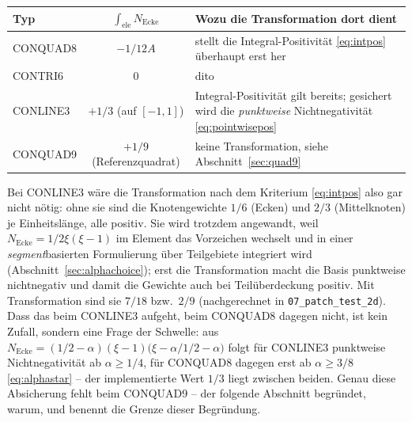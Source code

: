 \documentclass[a4paper,11pt]{article}
\def\tfrac#1#2{#1/#2}%
\def\tilde#1{#1}%
\newcommand{\file}[1]{\texttt{\small #1}}
\begin{document}
\begin{center}
\small
\begin{tabularx}{\linewidth}{lcX}
\toprule
Typ & $\int_{\text{ele}} N_{\text{Ecke}}$ & Wozu die Transformation dort dient \\
\midrule
CONQUAD8 & $-\tfrac{1}{12}A$ & stellt die Integral-Positivität \eqref{eq:intpos} überhaupt erst her \\
CONTRI6  & $0$               & dito \\
CONLINE3 & $+\tfrac13$ (auf $[-1,1]$) & Integral-Positivität gilt bereits; gesichert wird die
   \emph{punktweise} Nichtnegativität \eqref{eq:pointwisepos} \\
CONQUAD9 & $+\tfrac19$ (Referenzquadrat) & keine Transformation, siehe Abschnitt~\ref{sec:quad9} \\
\bottomrule
\end{tabularx}
\end{center}

\noindent Bei CONLINE3 wäre die Transformation nach dem Kriterium \eqref{eq:intpos} also gar nicht
nötig: ohne sie sind die Knotengewichte $\tfrac16$ (Ecken) und $\tfrac23$ (Mittelknoten) je
Einheitslänge, alle positiv. Sie wird trotzdem angewandt, weil
$N_{\text{Ecke}}=\tfrac12\xi(\xi-1)$ im Element das Vorzeichen wechselt und in einer
\emph{segment}basierten Formulierung über Teilgebiete integriert wird
(Abschnitt~\ref{sec:alphachoice}); erst die Transformation macht die Basis punktweise
nichtnegativ und damit die Gewichte auch bei Teilüberdeckung positiv. Mit Transformation sind sie
$\tfrac{7}{18}$ bzw.\ $\tfrac29$ (nachgerechnet in \file{07\_patch\_test\_2d}). Dass das beim
CONLINE3 aufgeht, beim CONQUAD8 dagegen nicht, ist kein Zufall, sondern eine Frage der Schwelle:
aus $\tilde N_{\text{Ecke}}=(\tfrac12-\alpha)(\xi-1)\big(\xi-\tfrac{\alpha}{1/2-\alpha}\big)$ folgt
für CONLINE3 punktweise Nichtnegativität ab $\alpha\ge\tfrac14$, für CONQUAD8 dagegen erst ab
$\alpha\ge\tfrac38$ \eqref{eq:alphastar} -- der implementierte Wert $\tfrac13$ liegt zwischen
beiden. Genau diese Absicherung fehlt beim CONQUAD9 -- der folgende Abschnitt begründet, warum,
und benennt die Grenze dieser Begründung.
\end{document}
